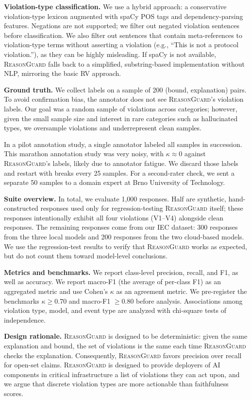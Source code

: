 \documentclass[conference]{IEEEtran}
\newcommand{\rg}{\textsc{ReasonGuard}}
\begin{document}
\noindent\textbf{Violation-type classification.}
We use a hybrid approach: a conservative violation-type lexicon augmented with spaCy POS tags and dependency-parsing features. Negations are not supported; we filter out negated violation sentences before classification. We also filter out sentences that contain meta-references to violation-type terms without asserting a violation (e.g., ``This is not a protocol violation.''), as they can be highly misleading. If spaCy is not available, \rg{} falls back to a simplified, substring-based implementation without NLP, mirroring the basic RV approach.

\noindent\textbf{Ground truth.}
We collect labels on a sample of 200 (bound, explanation) pairs. To avoid confirmation bias, the annotator does not see \rg's violation labels. Our goal was a random sample of violations across categories; however, given the small sample size and interest in rare categories such as hallucinated types, we oversample violations and underrepresent clean samples.

In a pilot annotation study, a single annotator labeled all samples in succession. This marathon annotation study was very noisy, with $\kappa \approx 0$ against \rg's labels, likely due to annotator fatigue. We discard those labels and restart with breaks every 25 samples. For a second-rater check, we sent a separate 50 samples to a domain expert at Brno University of Technology.

\noindent\textbf{Suite overview.}
In total, we evaluate 1,000 responses. Half are synthetic, hand-constructed responses used only for regression-testing \rg{} itself; these responses intentionally exhibit all four violations (V1--V4) alongside clean responses. The remaining responses come from our IEC dataset: 300 responses from the three local models and 200 responses from the two cloud-based models. We use the regression-test results to verify that \rg{} works as expected, but do not count them toward model-level conclusions.

\noindent\textbf{Metrics and benchmarks.}
We report class-level precision, recall, and F1, as well as accuracy. We report macro-F1 (the average of per-class F1) as an aggregated metric and use Cohen's $\kappa$ as an agreement metric. We pre-register the benchmarks $\kappa \ge 0.70$ and macro-F1 $\ge 0.80$ before analysis. Associations among violation type, model, and event type are analyzed with chi-square tests of independence.

\noindent\textbf{Design rationale.}
\rg{} is designed to be deterministic: given the same explanation and bound, the set of violations is the same each time \rg{} checks the explanation. Consequently, \rg{} favors precision over recall for open-set claims. \rg{} is designed to provide deployers of AI components in critical infrastructure a list of violations they can act upon, and we argue that discrete violation types are more actionable than faithfulness scores.
\end{document}
